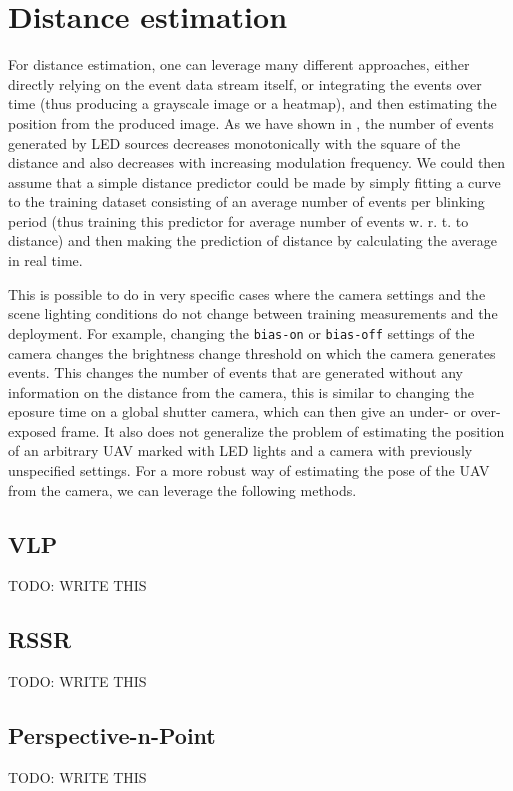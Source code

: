 
\chapter{Distance estimation\label{chap:p3p}}

For distance estimation, one can leverage many different approaches, either directly relying on the event data stream itself, or integrating the
events over time (thus producing a grayscale image or a heatmap), and then estimating the position from the produced image. As we have shown in , the number of events
generated by LED sources decreases monotonically with the square of the distance and also decreases with increasing modulation frequency.
We could then assume that a simple distance predictor could be made by simply fitting a curve to the training dataset consisting of an average
number of events per blinking period (thus training this predictor for average number of events w. r. t. to distance) and then making the prediction of distance by calculating the average in real time.

This is possible to do in very specific cases where the camera settings and the scene lighting conditions do not change between training measurements
and the deployment. For example, changing the \texttt{bias-on} or \texttt{bias-off} settings of the camera changes the brightness change threshold on
which the camera generates events.
This changes the number of events that are generated without any information on the distance from the camera, this is similar to changing the eposure
time on a global shutter camera, which can then give an under- or over-exposed frame.
It also does not generalize the problem of estimating the position of an arbitrary UAV marked with LED lights and a camera with previously unspecified
settings. For a more robust way of estimating the pose of the UAV from the camera, we can leverage the following methods.

\section{VLP}
TODO: WRITE THIS

\section{RSSR}
TODO: WRITE THIS

\section{Perspective-n-Point}
TODO: WRITE THIS
